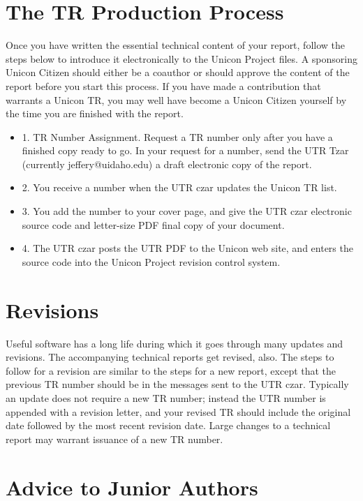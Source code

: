 \documentclass[letterpaper,12pt]{article}
\begin{document}
\section{The TR Production Process}

Once you have written the essential technical content of your report,
follow the steps below to introduce it electronically to the Unicon
Project files. A sponsoring Unicon Citizen should either be a coauthor
or should approve the content of the report before you start this
process. If you have made a contribution that warrants a Unicon TR,
you may well have become a Unicon Citizen yourself by the time you
are finished with the report.

\begin{itemize}
\item 1. TR Number Assignment.
Request a TR number only after you have a finished copy ready to
go. In your request for a number, send the UTR Tzar (currently
jeffery@uidaho.edu) a draft electronic copy of the report.
\item 2. You receive a number when the UTR czar updates the Unicon TR list.
\item 3. You add the number to your cover page, and give the UTR czar
electronic source code and letter-size PDF final copy of your document.
\item 4. The UTR czar posts the UTR PDF to the Unicon web site, and
enters the source code into the Unicon Project revision control system.
\end{itemize}

\section{Revisions}

Useful software has a long life during which it goes through many
updates and revisions. The accompanying technical reports get revised,
also. The steps to follow for a revision are similar to the steps for
a new report, except that the previous TR number should be in the
messages sent to the UTR czar. Typically an update does not require a
new TR number; instead the UTR number is appended with a revision
letter, and your revised TR should include the original date
followed by the most recent revision date. Large changes to a
technical report may warrant issuance of a new TR number.

\section{Advice to Junior Authors}
\end{document}
